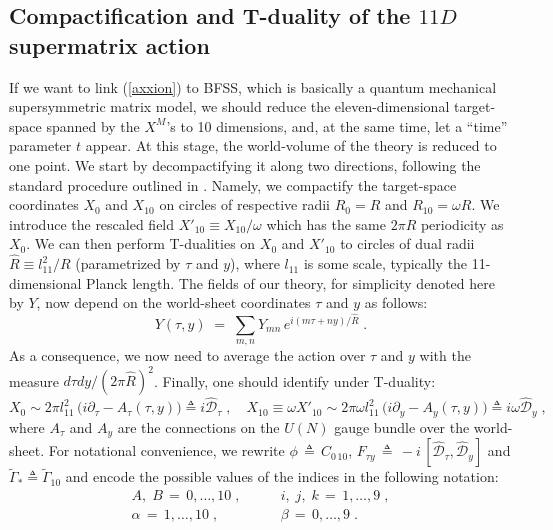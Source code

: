 \documentclass[a4paper,11pt]{article}
\begin{document}
\subsection{Compactification and T-duality of the $11D$ supermatrix action}

If we want to link (\ref{axxion}) to BFSS, which is basically a quantum
mechanical supersymmetric matrix model, we should reduce the eleven-dimensional target-space 
spanned by the $X^M$'s to 10 dimensions, and, at the same time, let a ``time'' parameter $t$ appear. 
At this stage, the world-volume of the theory is reduced to one point. We start by decompactifying it 
along two directions, following the standard procedure outlined in \cite{Wati}. Namely, we compactify
the target-space coordinates $X_0$ and $X_{10}$ on circles of respective radii $R_0=R$ and $R_{10}=\omega R$.
We introduce the rescaled field $X'_{10} \equiv X_{10}/\omega$ which has the same $2\pi R$ periodicity as $X_0$. 
We can then perform T-dualities on $X_0$ and $X'_{10}$ to circles of dual radii $ \widehat{R} \equiv l^2_{11}/R$ 
(parametrized by $\tau$ and $y$), where $l_{11}$ is some scale, typically the 11-dimensional Planck length. 
The fields of our theory, for simplicity denoted here by $Y$, now depend on the world-sheet coordinates $\tau$
and $y$ as follows: 
\begin{equation}  \label{eq:compk}
Y(\tau,y)\;=\; \sum_{m,n} Y_{mn}\,e^{i (m\tau+ny)/\widehat{R}} \;.
\end{equation}
As a consequence, we now need to average the action over $\tau$ and $y$
with the measure $d\tau dy/(2\pi\widehat{R})^2$. Finally, one should identify under T-duality:
\begin{equation}  \label{eq:compk2}
X_0\sim 2\pi l^2_{11}\,\Big(i\partial_{\tau}-A_{\tau}(\tau,y)\Big)\triangleq i\mathcal{\widehat{D}}_{\tau}\;,\quad
X_{10} \equiv \omega X'_{10} \sim 2\pi\omega l^2_{11}\,\Big(i\partial_{y}-A_{y}(\tau,y)\Big)\triangleq i \omega 
\mathcal{\widehat{D}}_y\;,
\end{equation}
where $A_{\tau}$ and $A_y$ are the connections on the $U(N)$ gauge bundle over the world-sheet. 
For notational convenience, we rewrite $\phi \,\triangleq \,C_{0\,10}$, 
$F_{\tau y} \, \triangleq \, -i \, [\mathcal{\widehat{D}}_{\tau},\mathcal{\widehat{D}}_{y}]$ and 
$\widetilde{\Gamma}_{*}\triangleq\widetilde{\Gamma}_{10} $ and encode the possible values of the indices 
in the following notation: 
\begin{align*}
A,\; B\,=\,0,\ldots ,10\;, &\qquad i,\;j,\;k\,=\,1,\ldots ,9\;, \\
\alpha\,=\,1,\ldots ,10\;, &\qquad \beta\,=\,0,\ldots ,9\;.
\end{align*}
\end{document}
